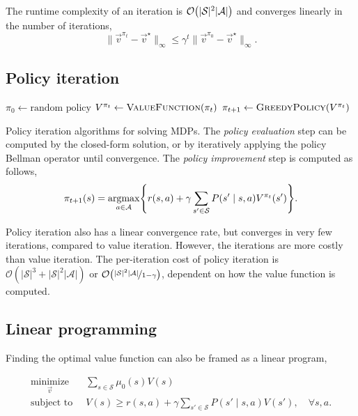 The runtime complexity of an iteration is $\bigo{|\mathcal{S}|^2 |\mathcal{A}|}$ and converges
linearly in the number of iterations, \[
    \| \vec{v}^{\pi_t} - \vec{v}^\star \|_\infty \leq \gamma^t \| \vec{v}^{\pi_0} - \vec{v}^\star \|_\infty.
\]

\subsection{Policy iteration}

\begin{algorithm}
    \begin{algorithmic}[1]
        \State $\pi_0 \gets \text{random policy}$
        \State $V^{\pi_t} \gets \Call{ValueFunction}{\pi_t}$ 
        \State $\pi_{t+1} \gets \Call{GreedyPolicy}{V^{\pi_t}}$ 
        \EndWhile
    \end{algorithmic}
    \caption{Policy iteration algorithms for solving MDPs. The \textit{policy evaluation} step can be
        computed by the closed-form solution, or by iteratively applying the policy Bellman operator
        until convergence. The \textit{policy improvement} step is computed as follows, \[
            \pi_{t+1}(s) = \argmax_{a\in \mathcal{A}} \lft\{ r(s,a) + \gamma \sum_{s'\in \mathcal{S}} P(s'\mid s,a) V^{\pi_t}(s') \rgt\}.
        \]}
\end{algorithm}

Policy iteration also has a linear convergence rate, but converges in very few iterations, compared
to value iteration. However, the iterations are more costly than value iteration. The per-iteration
cost of policy iteration is $\mathcal{O}(|\mathcal{S}|^3 + |\mathcal{S}|^2|\mathcal{A}|)$ or
$\bigo{\nicefrac{|\mathcal{S}|^2|\mathcal{A}|}{1-\gamma}}$, dependent on how the value function is
computed.

\subsection{Linear programming}

Finding the optimal value function can also be framed as a linear program,

\begin{important}
    \begin{align*}
        \underset{\vec{v}}{\text{minimize}} \;\; & \sum_{s\in \mathcal{S}} \mu_0(s) V(s)                                                        \\
        \text{subject to} \;\;                   & V(s) \geq r(s,a) + \gamma \sum_{s' \in \mathcal{S}} P(s'\mid s, a) V(s'), \quad \forall s,a.
    \end{align*}
\end{important}

